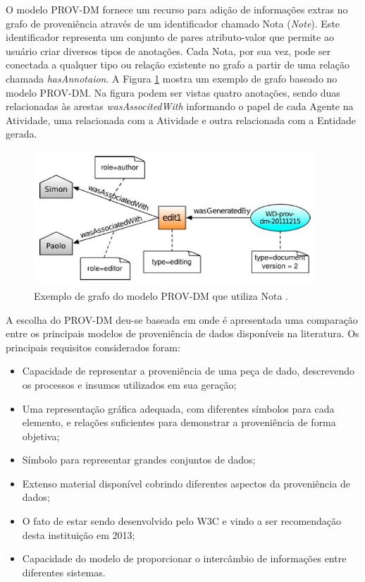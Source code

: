O modelo PROV-DM fornece um recurso para adição de informações extras no grafo de proveniência através de um identificador chamado Nota (\textit{Note}). Este identificador representa um conjunto de pares atributo-valor que permite ao usuário criar diversos tipos de anotações. Cada Nota, por sua vez, pode ser conectada a qualquer tipo ou relação existente no grafo a partir de uma relação chamada \textit{hasAnnotaion}. A Figura \ref{fig:grafoproveniencia} mostra um exemplo de grafo baseado no modelo PROV-DM. Na figura podem ser vistas quatro anotações, sendo duas relacionadas às arestas \textit{wasAssocitedWith} informando o papel de cada Agente na Atividade, uma relacionada com a Atividade e outra relacionada com a Entidade gerada.

\begin{figure}[h!]
\centering
\includegraphics[width=300pt]{images/grafoproveniencia.png}
\caption{Exemplo de grafo do modelo PROV-DM que utiliza Nota \cite{w3c}.}
\label{fig:grafoproveniencia}
\end{figure}

A escolha do PROV-DM deu-se baseada em \cite{renato} onde é apresentada uma comparação entre os principais modelos de proveniência de dados disponíveis na literatura. Os principais requisitos considerados foram:
\begin{itemize}
\item Capacidade de representar a proveniência de uma peça de dado, descrevendo os processos e insumos utilizados em sua geração;
\item Uma representação gráfica adequada, com diferentes símbolos para cada elemento, e relações suficientes para demonstrar a proveniência de forma objetiva;
\item Símbolo para representar grandes conjuntos de dados;
\item Extenso material disponível cobrindo diferentes aspectos da proveniência de dados;
\item O fato de estar sendo desenvolvido pelo W3C e vindo a ser recomendação desta instituição em 2013;
\item Capacidade do modelo de proporcionar o intercâmbio de informações entre diferentes sistemas.
\end{itemize}

